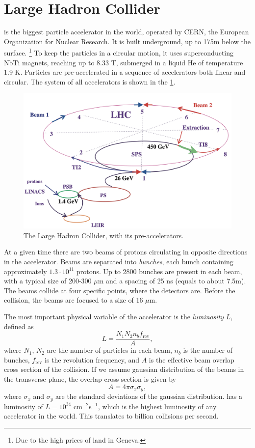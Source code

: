\section{Large Hadron Collider}
\label{sec:lhc}
\LHC is the biggest particle accelerator in the world, operated by CERN, the European Organization for Nuclear Research.
It is built underground, up to 175m below the surface. \footnote{Due to the high prices of land in Geneva.}
To keep the particles in a circular motion, it uses superconducting NbTi magnets, reaching up to 8.33 T, submerged in a liquid He of temperature 1.9 K.
Particles are pre-accelerated in a sequence of accelerators both linear and circular.
The system of all accelerators is shown in the \cref{fig:lhc}.
\begin{figure}[htb]
    \centering
    \includegraphics[width=0.9\linewidth]{src/img/LHC.png}
    \caption{The Large Hadron Collider, with its pre-accelerators.}
    \label{fig:lhc}
\end{figure}


At a given time there are two beams of protons circulating in opposite directions in the accelerator.
Beams are separated into \emph{bunches}, each bunch containing approximately $1.3\cdot10^{11}$ protons.
Up to 2800 bunches are present in each beam, with a typical size of 200-300 $\mu$m and a spacing of 25 ns (equals to about 7.5m).
The beams collide at four specific points, where the detectors are.
Before the collision, the beams are focused to a size of 16 $\mu$m.

The most important physical variable of the accelerator is the \emph{luminosity} $L$, defined as 
\begin{equation}
    \label{eq:lumni}
    L = \frac{N_1 N_2 n_b f_{\text{rev}}}{A}, 
\end{equation}
where $N_1$, $N_2$ are the number of particles in each beam, $n_b$ is the number of bunches, $f_{\text{rev}}$ is the revolution frequency, and $A$ is the effective beam overlap cross section of the collision. 
If we assume gaussian distribution of the beams in the transverse plane, the overlap cross section is given by 
\begin{equation}
    A = 4 \pi \sigma_x \sigma_y,
\end{equation}
where $\sigma_x$ and $\sigma_y$ are the standard deviations of the gaussian distribution.
\LHC has a luminosity of $L = 10^{34}$ cm$^{-2}$s$^{-1}$, which is the highest luminosity of any accelerator in the world. 
This translates to billion collisions per second.

